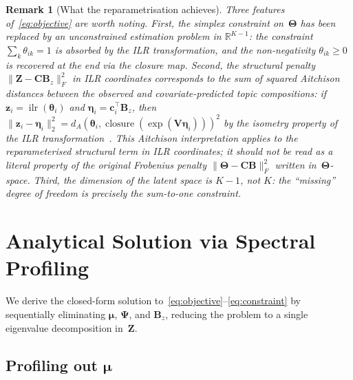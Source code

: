 \documentclass{article}
\newtheorem{remark}{Remark}
\DeclareMathOperator{\closure}{closure}
\DeclareMathOperator{\ilr}{ilr}
\begin{document}
\begin{remark}[What the reparametrisation achieves]
\label{rem:what_reparam_achieves}
Three features of~\eqref{eq:objective} are worth noting.
%
First, the simplex constraint on~$\boldsymbol{\Theta}$ has been replaced
by an unconstrained estimation problem in $\mathbb{R}^{K-1}$: the
constraint $\sum_k\theta_{ik}=1$ is absorbed by the ILR transformation,
and the non-negativity $\theta_{ik}\geq 0$ is recovered at the end via
the closure map.
%
Second, the structural penalty
$\|\mathbf{Z}-\mathbf{C}\mathbf{B}_z\|_F^2$ in ILR coordinates
corresponds to the sum of squared Aitchison distances between the
observed and covariate-predicted topic compositions:
if $\mathbf{z}_i = \ilr(\boldsymbol{\theta}_i)$ and
$\boldsymbol{\eta}_i = \mathbf{c}_i^{\!\top}\mathbf{B}_z$, then
$\|\mathbf{z}_i - \boldsymbol{\eta}_i\|_2^2
 = d_A(\boldsymbol{\theta}_i,
       \closure(\exp(\mathbf{V}\boldsymbol{\eta}_i)))^2$
by the isometry property of the ILR
transformation~\citep{aitchison1986statistical}.
This Aitchison interpretation applies to the reparameterised
structural term in ILR coordinates; it should not be read as a literal
property of the original Frobenius penalty
$\|\boldsymbol{\Theta}-\mathbf{C}\mathbf{B}\|_F^2$ written
in~$\boldsymbol{\Theta}$-space.
%
Third, the dimension of the latent space is $K{-}1$, not $K$: the
``missing'' degree of freedom is precisely the sum-to-one constraint.
\end{remark}


\section{Analytical Solution via Spectral Profiling}
\label{sec:analytical}

We derive the closed-form solution
to~\eqref{eq:objective}--\eqref{eq:constraint} by sequentially
eliminating $\boldsymbol{\mu}$, $\boldsymbol{\Psi}$, and
$\mathbf{B}_z$, reducing the problem to a single eigenvalue
decomposition in~$\mathbf{Z}$.

\subsection{Profiling out
\texorpdfstring{$\boldsymbol{\mu}$}{μ}}
\label{subsec:profile_mu}
\end{document}
